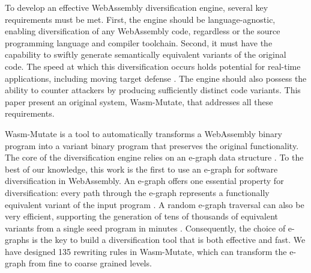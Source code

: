 \documentclass[a4paper,fleqn]{cas-dc}
\newcommand*\badge[1]{ \colorbox{red}{\color{white}#1}}
\newcommand{\tool}{{\sc Wasm-Mutate}\xspace}
\newcommand{\Wasm}{WebAssembly\xspace}
\newcommand{\wasm}{\Wasm}
\newcommand{\todo}[1]{%
\refstepcounter{todo}
\noindent\textbf{\badge{TODO}} {\color{red}#1}
\addcontentsline{td}{todo}
{\color{red}\thesection.\thetodo\xspace #1}}
\begin{document}
To develop an effective \wasm diversification engine, several key requirements must be met. 
First, the engine should be language-agnostic, enabling diversification of any \Wasm code, regardless or the source programming language and compiler toolchain.
Second, it must have the capability to swiftly generate semantically equivalent variants of the original code. 
The speed at which this diversification occurs holds potential for real-time applications, including  moving target defense \cite{MEWE}. 
The engine should also possess the ability to counter attackers by producing sufficiently distinct code variants.
This paper present an original system, \tool, that addresses all these requirements.

\tool is a tool to automatically transforms a \wasm binary program into a variant binary program that preserves the original functionality. The core of the diversification engine relies on an e-graph data structure \cite{10.1145/3434304}.
To the best of our knowledge, this work is the first to use an e-graph  for software diversification in \Wasm. An e-graph offers one essential property for diversification:  every path through the e-graph represents a functionally equivalent variant of the input program \cite{10.1145/3434304, 10.1145/3385412.3386001}.  
A random e-graph traversal can also be very efficient, supporting the generation of tens of thousands of equivalent variants from a single seed program in minutes \cite{10.1145/3547622}. 
Consequently, the choice of e-graphs is the key to build a diversification tool that is both effective and fast.
We have designed 135 rewriting rules in \tool, which can transform the e-graph from fine to coarse grained levels. 
\end{document}
